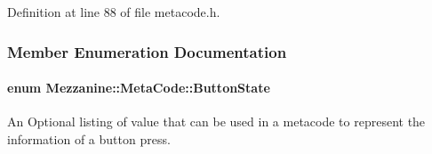 Definition at line 88 of file metacode.h.



\subsubsection{Member Enumeration Documentation}
\hypertarget{classMezzanine_1_1MetaCode_a65b6d86ef846369bd8f3fd944a455fd0}{
\paragraph[{ButtonState}]{\setlength{\rightskip}{0pt plus 5cm}enum {\bf Mezzanine::MetaCode::ButtonState}}\hfill}
\label{classMezzanine_1_1MetaCode_a65b6d86ef846369bd8f3fd944a455fd0}


An Optional listing of value that can be used in a metacode to represent the information of a button press. 


